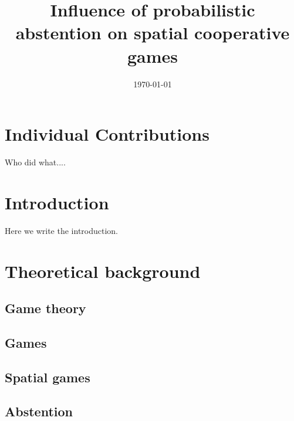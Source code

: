 \documentclass[12pt,oneside,a4paper,fleqn]{article}
\title{Influence of probabilistic abstention on spatial cooperative games}
\date{\today}
\begin{document}
\maketitle 							%

\tableofcontents
\newpage




\pagestyle{fancy}               	%
\setlength{\parindent}{20pt}

\section*{Individual Contributions}
\label{chap:indv}

Who did what....

\newpage
{}
\section*{Introduction}

\label{chap:intro}

Here we write the introduction.


\section{Theoretical background}
\subsection{Game theory}
\subsection{Games}
\subsection{Spatial games}

\subsection{Abstention}
\end{document}
